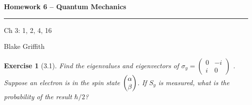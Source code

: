 
\usepackage{amsfonts, amsmath, amsthm}

\setlength{\parskip}{1ex}
\setlength{\parindent}{0pt}

\newtheorem*{exer}{Exercise}

\newcommand{\floor}{\text{floor }}
\newcommand{\img}{\text{img }}
\newcommand{\lcm}{\text{lcm }}
\newcommand{\aut}{\text{Aut }}
\newcommand{\cycle}[1]{(\mathbf{#1})}



\textbf{Homework 6 -- Quantum Mechanics} \\

\hrule

\begin{minipage}{.80\linewidth}
    \flushleft
    Ch 3: 1, 2, 4, 16 \\
\end{minipage}
\begin{minipage}{.20\linewidth}
    \flushright
    Blake Griffith
\end{minipage}


\begin{exer}[3.1]

    Find the eigenvalues and eigenvectors of
    $\sigma_y = \begin{pmatrix}
        0 & -i \\
        i & 0
    \end{pmatrix}$
    . Suppose an electron is in the spin state $
    \begin{pmatrix} \alpha \\ \beta \end{pmatrix} $. If $S_y$ is measured, what is the
    probability of the result $\hbar / 2$?


\end{exer}

